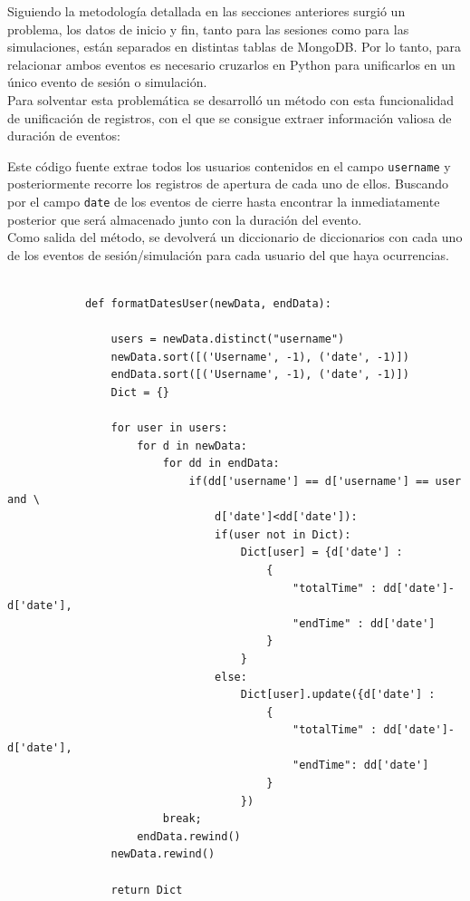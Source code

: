 \documentclass[a4paper, 12pt]{book}
\begin{document}
		Siguiendo la metodología detallada en las secciones anteriores surgió un problema, los datos de inicio y fin, tanto para las sesiones como para las simulaciones, están separados en distintas tablas de MongoDB. Por lo tanto, para relacionar ambos eventos es necesario cruzarlos en Python para unificarlos en un único evento de sesión o simulación. \\
		
		Para solventar esta problemática se desarrolló un método con esta funcionalidad de unificación de registros, con el que se consigue extraer información valiosa de duración de eventos:
		
		Este código fuente extrae todos los usuarios contenidos en el campo \texttt{username} y posteriormente recorre los registros de apertura de cada uno de ellos. Buscando por el campo \texttt{date} de los eventos de cierre hasta encontrar la inmediatamente posterior que será almacenado junto con la duración del evento. \\
		
		Como salida del método, se devolverá un diccionario de diccionarios con cada uno de los eventos de sesión/simulación para cada usuario del que haya ocurrencias.\\
		
		{\footnotesize
		\begin{verbatim}
		
			def formatDatesUser(newData, endData):
			
			    users = newData.distinct("username")
			    newData.sort([('Username', -1), ('date', -1)])
			    endData.sort([('Username', -1), ('date', -1)])
			    Dict = {}
			
			    for user in users:
			        for d in newData:
			            for dd in endData:
			                if(dd['username'] == d['username'] == user and \
			                    d['date']<dd['date']):
			                    if(user not in Dict):
			                        Dict[user] = {d['date'] : 
			                            {
			                                "totalTime" : dd['date']-d['date'],
			                                "endTime" : dd['date']
			                            }
			                        }
			                    else:
			                        Dict[user].update({d['date'] : 
			                            {
			                                "totalTime" : dd['date']-d['date'],
			                                "endTime": dd['date']
			                            }
			                        })
			            break;
			        endData.rewind()
			    newData.rewind()
			
			    return Dict
			    
			    
			    
        \end{verbatim}
        }
    
\end{document}
